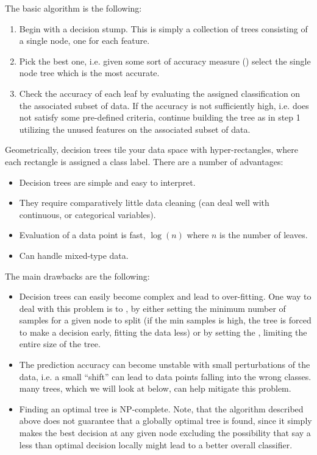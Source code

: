 The basic algorithm is the following:

\begin{enumerate}

    \item Begin with a decision stump. This is simply a collection of trees consisting of a single node, one for each feature. 
    \item Pick the best one, i.e. given some sort of accuracy measure () select the single node tree which is the most accurate. 
    \item Check the accuracy of each leaf by evaluating the assigned classification on the associated subset of data. If the accuracy is not sufficiently high, i.e. does not satisfy some pre-defined criteria, continue building the tree as in step 1  utilizing the unused features on the associated subset of data.
\end{enumerate}

Geometrically, decision trees tile your data space with hyper-rectangles, where each rectangle is assigned a class label. There are a number of advantages:

\begin{itemize}

    \item Decision trees are simple and easy to interpret.
    \item They require comparatively little data cleaning (can deal well with continuous, or categorical variables).
    \item Evaluation of a data point is fast, $\log(n)$ where $n$ is the number of leaves.
    \item Can handle mixed-type data.
        
\end{itemize}


The main drawbacks are the following:

\begin{itemize}

    \item Decision trees can easily become complex and lead to over-fitting. One way to deal with this problem is to , by either setting the minimum number of samples for a given node to split (if the min samples is high, the tree is forced to make a decision early, fitting the data less) or by setting the , limiting the entire size of the tree.
    \item The prediction accuracy can become unstable with small perturbations of the data, i.e. a small ``shift'' can lead to data points falling into the wrong classes.  many trees, which we will look at below, can help mitigate this problem.
    \item Finding an optimal tree is NP-complete. Note, that the algorithm described above does not guarantee that a globally optimal tree is found, since it simply makes the best decision at any given node excluding the possibility that say a less than optimal decision locally might lead to a better overall classifier. 
\end{itemize}



